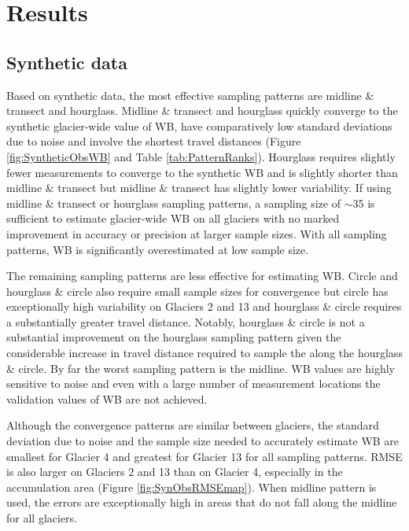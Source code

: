 \documentclass{article}
\begin{document}
\section{Results }

\subsection{Synthetic data}

Based on synthetic data, the most effective sampling patterns are midline \& transect and hourglass. Midline \& transect and hourglass quickly converge to the synthetic glacier-wide value of WB, have comparatively low standard deviations due to noise and involve the shortest travel distances (Figure \ref{fig:SyntheticObsWB} and Table \ref{tab:PatternRanks}). Hourglass requires slightly fewer measurements to converge to the synthetic WB and is slightly shorter than midline \& transect but midline \& transect has slightly lower variability. If using midline \& transect or hourglass sampling patterns, a sampling size of $\sim$35 is sufficient to estimate glacier-wide WB on all glaciers with no marked improvement in accuracy or precision at larger sample sizes. With all sampling patterns, WB is significantly overestimated at low sample size.

The remaining sampling patterns are less effective for estimating WB. Circle and hourglass \& circle also require small sample sizes for convergence but circle has exceptionally high variability on Glaciers 2 and 13 and hourglass \& circle requires a substantially greater travel distance. Notably, hourglass \& circle is not a substantial improvement on the hourglass sampling pattern given the considerable increase in travel distance required to sample the along the hourglass \& circle. By far the worst sampling pattern is the midline. WB values are highly sensitive to noise and even with a large number of measurement locations the validation values of WB are not achieved.

Although the convergence patterns are similar between glaciers, the standard deviation due to noise and the sample size needed to accurately estimate WB are smallest for Glacier 4 and greatest for Glacier 13 for all sampling patterns. RMSE is also larger on Glaciers 2 and 13 than on Glacier 4, especially in the accumulation area (Figure \ref{fig:SynObsRMSEmap}). When midline pattern is used, the errors are exceptionally high in areas that do not fall along the midline for all glaciers.
\end{document}
